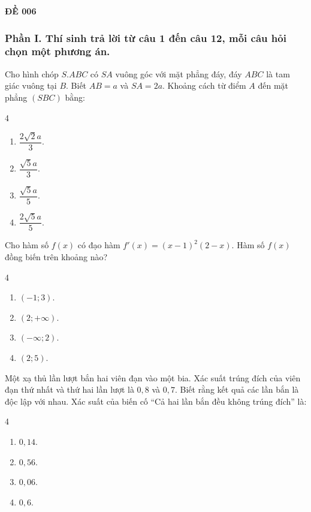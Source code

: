 \begin{center}
	\textbf{{\Huge ĐỀ 006}}
\end{center}
\subsubsection*{Phần I. Thí sinh trả lời từ câu 1 đến câu 12, mỗi câu hỏi chọn một phương án.}
\setcounter{bt}{0}
\begin{baitap}
	Cho hình chóp $S.ABC$ có $SA$ vuông góc với mặt phẳng đáy, đáy $ABC$ là tam giác vuông tại $B$. Biết $AB=a$ và $SA=2a$. Khoảng cách từ điểm $A$ đến mặt phẳng $(SBC)$ bằng:
	\begin{multicols}{4}
		\begin{enumerate}[\quad \bf A.]
			\item $\dfrac{2\sqrt{2}a}{3}$.
			\item $\dfrac{\sqrt{5}a}{3}$.
			\item $\dfrac{\sqrt{5}a}{5}$.
			\item $\dfrac{2\sqrt{5}a}{5}$.
		\end{enumerate}
	\end{multicols}
\end{baitap}

\begin{baitap}
	Cho hàm số $f(x)$ có đạo hàm $f'(x)=(x-1)^2(2-x)$. Hàm số $f(x)$ đồng biến trên khoảng nào?
	\begin{multicols}{4}
		\begin{enumerate}[\quad \bf A.]
			\item $(-1;3)$.
			\item $(2;+\infty)$.
			\item $(-\infty;2)$.
			\item $(2;5)$.
		\end{enumerate}
	\end{multicols}
\end{baitap}

\begin{baitap}
	Một xạ thủ lần lượt bắn hai viên đạn vào một bia. Xác suất trúng đích của viên đạn thứ nhất và thứ hai lần lượt là $0{,}8$ và $0{,}7$. Biết rằng kết quả các lần bắn là độc lập với nhau. Xác suất của biến cố ``Cả hai lần bắn đều không trúng đích'' là:
	\begin{multicols}{4}
		\begin{enumerate}[\quad \bf A.]
			\item $0{,}14$.
			\item $0{,}56$.
			\item $0{,}06$.
			\item $0{,}6$.
		\end{enumerate}
	\end{multicols}
\end{baitap}

